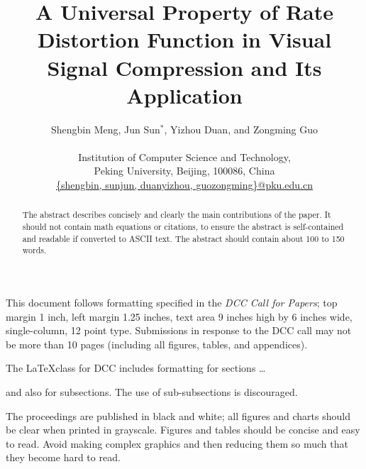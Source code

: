 \documentclass[smallabstract,smallcaptions]{dccpaper}
\begin{document}
\title
{\large
\textbf{A Universal Property of Rate Distortion Function in Visual Signal Compression and Its Application}
}

\author{%
Shengbin Meng, Jun Sun$^{\ast}$, Yizhou Duan, and Zongming Guo\\[0.5em]
{\small\begin{minipage}{\linewidth}\begin{center}
\begin{tabular}{ccc}
Institution of Computer Science and Technology, \\
Peking University, Beijing, 100086, China\\
\url{{shengbin, sunjun, duanyizhou, guozongming}@pku.edu.cn}
\end{tabular}
\end{center}\end{minipage}}
}

\maketitle
\thispagestyle{empty}


\begin{abstract}
The abstract describes concisely and clearly the main contributions of
the paper. It should not contain math equations or citations, to ensure the
abstract is self-contained and readable if converted to ASCII text.
The abstract should contain about 100 to 150 words.
\end{abstract}


This document follows formatting specified in the \textit{DCC Call for Papers};
top margin 1 inch, left margin 1.25 inches, text area 9 inches high by
6 inches wide, single-column, 12 point type. Submissions in response
to the DCC call may not be more than 10 pages (including all figures,
tables, and appendices).


The \LaTeX class for DCC includes formatting for sections \dots


and also for subsections. The use of sub-subsections is discouraged.


The proceedings are published in black and white; all figures and
charts should be clear when printed in grayscale. Figures and tables
should be concise and easy to read. Avoid making complex graphics and
then reducing them so much that they become hard to read.
\end{document}

